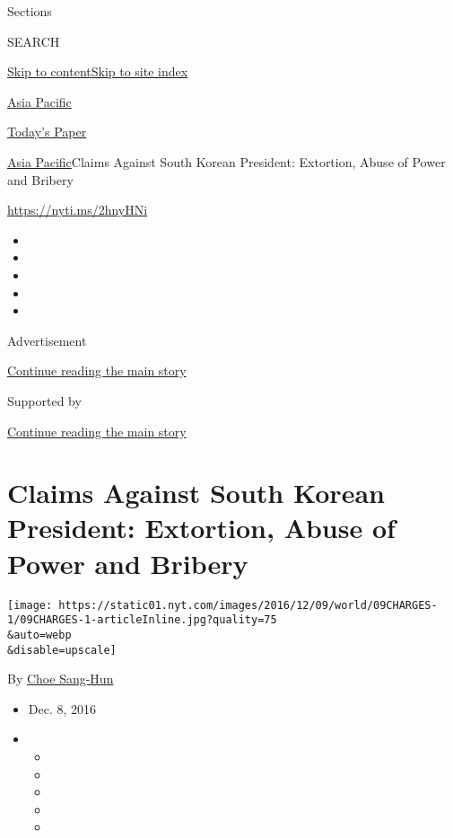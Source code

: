 Sections

SEARCH

\protect\hyperlink{site-content}{Skip to
content}\protect\hyperlink{site-index}{Skip to site index}

\href{https://www.nytimes.com/section/world/asia}{Asia Pacific}

\href{https://myaccount.nytimes.com/auth/login?response_type=cookie\&client_id=vi}{}

\href{https://www.nytimes.com/section/todayspaper}{Today's Paper}

\href{/section/world/asia}{Asia Pacific}\textbar{}Claims Against South
Korean President: Extortion, Abuse of Power and Bribery

\url{https://nyti.ms/2hnyHNi}

\begin{itemize}
\item
\item
\item
\item
\item
\end{itemize}

Advertisement

\protect\hyperlink{after-top}{Continue reading the main story}

Supported by

\protect\hyperlink{after-sponsor}{Continue reading the main story}

\hypertarget{claims-against-south-korean-president-extortion-abuse-of-power-and-bribery}{%
\section{Claims Against South Korean President: Extortion, Abuse of
Power and
Bribery}\label{claims-against-south-korean-president-extortion-abuse-of-power-and-bribery}}

\texttt{[image: https://static01.nyt.com/images/2016/12/09/world/09CHARGES-1/09CHARGES-1-articleInline.jpg?quality=75\\\&auto=webp\\\&disable=upscale]}

By \href{http://www.nytimes.com/by/choe-sang-hun}{Choe Sang-Hun}

\begin{itemize}
\item
  Dec. 8, 2016
\item
  \begin{itemize}
  \item
  \item
  \item
  \item
  \item
  \end{itemize}
\end{itemize}

